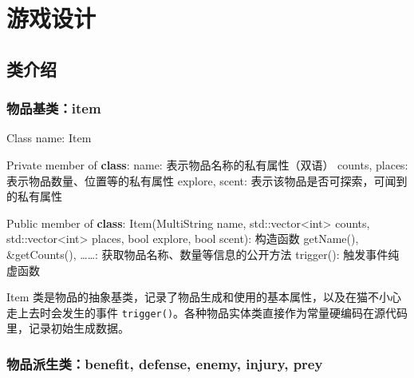 \documentclass[hyperref,UTF8,a4paper]{ctexart}
\newenvironment{Shaded}{}{}
\newcommand{\BuiltInTok}[1]{#1}
\newcommand{\DataTypeTok}[1]{\textcolor[rgb]{0.56,0.13,0.00}{#1}}
\newcommand{\KeywordTok}[1]{\textcolor[rgb]{0.00,0.44,0.13}{\textbf{#1}}}
\newcommand{\NormalTok}[1]{#1}
\begin{document}
\hypertarget{ux6e38ux620fux8bbeux8ba1}{%
\section{游戏设计}\label{ux6e38ux620fux8bbeux8ba1}}

\hypertarget{ux7c7bux4ecbux7ecd}{%
\subsection{类介绍}\label{ux7c7bux4ecbux7ecd}}

\hypertarget{ux7269ux54c1ux57faux7c7bitem}{%
\subsubsection{物品基类：item}\label{ux7269ux54c1ux57faux7c7bitem}}

\begin{Shaded}
\begin{Highlighting}[]
\NormalTok{Class name: Item}

\NormalTok{Private member of }\KeywordTok{class}\NormalTok{:}
\NormalTok{    name: 表示物品名称的私有属性（双语）}
\NormalTok{    counts, places: 表示物品数量、位置等的私有属性}
\NormalTok{    explore, scent: 表示该物品是否可探索，可闻到的私有属性}

\NormalTok{Public member of }\KeywordTok{class}\NormalTok{:}
\NormalTok{    Item(MultiString name, }\BuiltInTok{std::}\NormalTok{vector<}\DataTypeTok{int}\NormalTok{> counts, }\BuiltInTok{std::}\NormalTok{vector<}\DataTypeTok{int}\NormalTok{> places, }\DataTypeTok{bool}\NormalTok{ explore, }\DataTypeTok{bool}\NormalTok{ scent): 构造函数}
\NormalTok{    getName(), &getCounts(), ……: 获取物品名称、数量等信息的公开方法}
\NormalTok{    trigger(): 触发事件纯虚函数}
\end{Highlighting}
\end{Shaded}

Item
类是物品的抽象基类，记录了物品生成和使用的基本属性，以及在猫不小心走上去时会发生的事件
\texttt{trigger()}。各种物品实体类直接作为常量硬编码在源代码里，记录初始生成数据。

\hypertarget{ux7269ux54c1ux6d3eux751fux7c7bbenefit-defense-enemy-injury-prey}{%
\subsubsection{物品派生类：benefit, defense, enemy, injury,
prey}\label{ux7269ux54c1ux6d3eux751fux7c7bbenefit-defense-enemy-injury-prey}}
\end{document}
